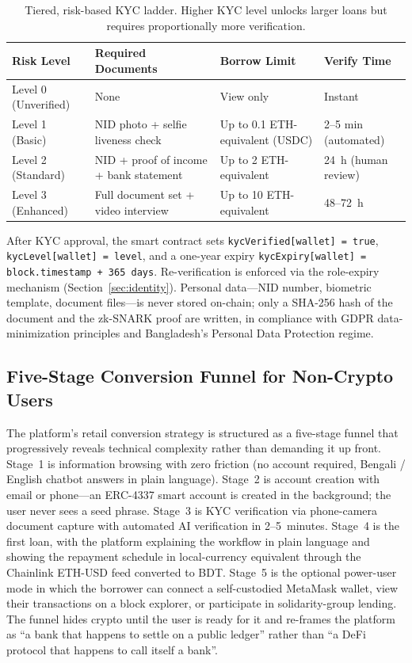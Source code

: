 \documentclass[12pt,a4paper]{report}
\begin{document}
\begin{table}[H]
\centering
\caption{Tiered, risk-based KYC ladder. Higher KYC level unlocks larger loans but requires proportionally more verification.}
\label{tab:tiered-kyc}
\begin{tabular}{p{2.2cm}p{5.8cm}p{2.8cm}p{2.6cm}}
\hline
\textbf{Risk Level} & \textbf{Required Documents} & \textbf{Borrow Limit} & \textbf{Verify Time} \\
\hline
Level 0 (Unverified) & None & View only & Instant \\
\hline
Level 1 (Basic) & NID photo + selfie liveness check & Up to 0.1 ETH-equivalent (USDC) & 2--5 min (automated) \\
\hline
Level 2 (Standard) & NID + proof of income + bank statement & Up to 2 ETH-equivalent & 24~h (human review) \\
\hline
Level 3 (Enhanced) & Full document set + video interview & Up to 10 ETH-equivalent & 48--72~h \\
\hline
\end{tabular}
\end{table}

After KYC approval, the smart contract sets \texttt{kycVerified[wallet] = true}, \texttt{kycLevel[wallet] = level}, and a one-year expiry \texttt{kycExpiry[wallet] = block.timestamp + 365 days}. Re-verification is enforced via the role-expiry mechanism (Section~\ref{sec:identity}). Personal data---NID number, biometric template, document files---is never stored on-chain; only a SHA-256 hash of the document and the zk-SNARK proof are written, in compliance with GDPR data-minimization principles and Bangladesh's Personal Data Protection regime.

\subsection{Five-Stage Conversion Funnel for Non-Crypto Users}
\label{sec:funnel}

The platform's retail conversion strategy is structured as a five-stage funnel that progressively reveals technical complexity rather than demanding it up front. Stage~1 is information browsing with zero friction (no account required, Bengali / English chatbot answers in plain language). Stage~2 is account creation with email or phone---an ERC-4337 smart account is created in the background; the user never sees a seed phrase. Stage~3 is KYC verification via phone-camera document capture with automated AI verification in 2--5~minutes. Stage~4 is the first loan, with the platform explaining the workflow in plain language and showing the repayment schedule in local-currency equivalent through the Chainlink ETH-USD feed converted to BDT. Stage~5 is the optional power-user mode in which the borrower can connect a self-custodied MetaMask wallet, view their transactions on a block explorer, or participate in solidarity-group lending. The funnel hides crypto until the user is ready for it and re-frames the platform as ``a bank that happens to settle on a public ledger'' rather than ``a DeFi protocol that happens to call itself a bank''.
\end{document}
